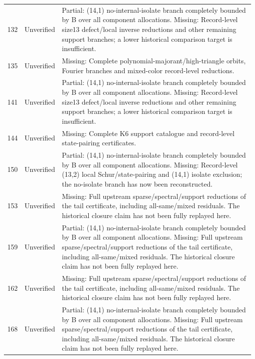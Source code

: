\begin{longtable}{@{}r p{31mm} p{102mm}@{}}
132 & Unverified & Partial: (14,1) no-internal-isolate branch completely bounded by B over all component allocations. Missing: Record-level size13 defect/local inverse reductions and other remaining support branches; a lower historical comparison target is insufficient. \\
135 & Unverified & Missing: Complete polynomial-majorant/high-triangle orbits, Fourier branches and mixed-color record-level reductions. \\
141 & Unverified & Partial: (14,1) no-internal-isolate branch completely bounded by B over all component allocations. Missing: Record-level size13 defect/local inverse reductions and other remaining support branches; a lower historical comparison target is insufficient. \\
144 & Unverified & Missing: Complete K6 support catalogue and record-level state-pairing certificates. \\
150 & Unverified & Partial: (14,1) no-internal-isolate branch completely bounded by B over all component allocations. Missing: Record-level (13,2) local Schur/state-pairing and (14,1) isolate exclusion; the no-isolate branch has now been reconstructed. \\
153 & Unverified & Missing: Full upstream sparse/spectral/support reductions of the tail certificate, including all-same/mixed residuals. The historical closure claim has not been fully replayed here. \\
159 & Unverified & Partial: (14,1) no-internal-isolate branch completely bounded by B over all component allocations. Missing: Full upstream sparse/spectral/support reductions of the tail certificate, including all-same/mixed residuals. The historical closure claim has not been fully replayed here. \\
162 & Unverified & Missing: Full upstream sparse/spectral/support reductions of the tail certificate, including all-same/mixed residuals. The historical closure claim has not been fully replayed here. \\
168 & Unverified & Partial: (14,1) no-internal-isolate branch completely bounded by B over all component allocations. Missing: Full upstream sparse/spectral/support reductions of the tail certificate, including all-same/mixed residuals. The historical closure claim has not been fully replayed here. \\
\end{longtable}
